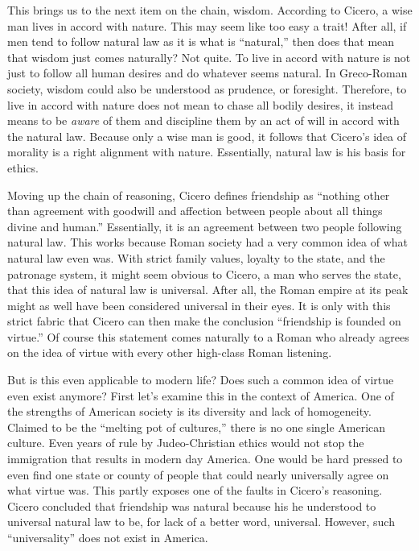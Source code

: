 \documentclass[12pt, letterpaper]{article}
\begin{document}
This brings us to the next item on the chain, wisdom. According to Cicero, a wise man lives in accord with 
nature.\cite[sec. 32]{cicero} This may seem like too easy a trait! After all, if men tend to follow natural law as it is what is 
``natural,'' then does that mean that wisdom just comes naturally? Not quite. To live in accord with nature 
is not just to follow all human desires and do whatever seems natural. In Greco-Roman society, wisdom 
could also be understood as prudence, or foresight. Therefore, to live in accord with nature does not mean 
to chase all bodily desires, it instead means to be \emph{aware} of them and discipline them by an act of will in accord with the natural law.
Because only a wise man is good, it follows that Cicero’s idea of morality is a right alignment with 
nature. Essentially, natural law is his basis for ethics.

Moving up the chain of reasoning, Cicero defines friendship as ``nothing other than agreement with goodwill 
and affection between people about all things divine and human.''\cite[sec. 20]{cicero} Essentially, it is an agreement between two 
people following natural law. This works because Roman society had a very common idea of what natural law even 
was. With strict family values, loyalty to the state, and the patronage system, 
it might seem obvious to Cicero, a man who serves the state, that this idea of natural law is universal. 
After all, the Roman empire at its peak might as well have been considered universal in their eyes. It is 
only with this strict fabric that Cicero can then make the conclusion ``friendship is founded on virtue.''\cite[sec. 37]{cicero} 
Of course this statement comes naturally to a Roman who already agrees on the idea of virtue with every other 
high-class Roman listening.

But is this even applicable to modern life? Does such a common idea of virtue even exist anymore? First let’s 
examine this in the context of America. One of the strengths of American society is its diversity and lack of 
homogeneity. Claimed to be the “melting pot of cultures,” there is no one single American culture. Even years
of rule by Judeo-Christian ethics would not stop the immigration that results in modern day America. One would be hard 
pressed to even find one state or county of people that could nearly universally agree on what virtue was. This 
partly exposes one of the faults in Cicero’s reasoning. 
Cicero concluded that friendship was natural because his he understood to universal natural law to be, for lack of a better word, universal.
However, such “universality” does not exist in America. 
\end{document}
